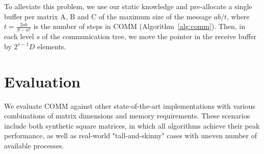 \documentclass[sigplan,review,anonymous,10pt]{acmart}\settopmatter{printfolios=true,printccs=false,printacmref=false}
\newcommand\greg[1]{\textcolor{blue}{[Greg: #1]}}
\begin{document}
To alleviate this problem, we use our static knowledge and pre-allocate a 
single buffer per matrix A, B and C of the maximum size of the message $ab/t$, 
where $t = \frac{2ab}{S - a^2}$ is the number of steps in COMM 
(Algorithm~\ref{alg:comm}). Then, in each level $s$ of the communication tree, 
we  move the pointer in the receive buffer by $2^{s-1} D$ elements.

%

\section{Evaluation}
\label{sec:evaluation}

We evaluate COMM against other state-of-the-art implementations with various 
combinations of matrix dimensions and memory requirements. These scenarios 
include both synthetic square matrices, in which all algorithms achieve their 
peak performance, as well as real-world "tall-and-skinny" cases with uneven 
number of available processes. 
 
\end{document}
